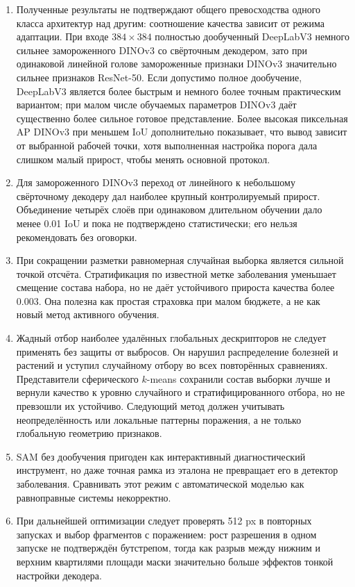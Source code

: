 \documentclass[a4paper,12pt]{extarticle}
\begin{document}
\begin{enumerate}
  \item Полученные результаты не подтверждают общего превосходства одного класса
  архитектур над другим: соотношение качества зависит от режима адаптации. При
  входе $384\times384$ полностью дообученный DeepLabV3 немного
  сильнее замороженного DINOv3 со свёрточным декодером, зато при одинаковой
  линейной голове замороженные признаки DINOv3 значительно сильнее признаков
  ResNet-50. Если допустимо полное дообучение, DeepLabV3 является более быстрым
  и немного более точным практическим вариантом; при малом числе обучаемых
  параметров DINOv3 даёт существенно более сильное готовое представление.
  Более высокая пиксельная AP DINOv3 при меньшем IoU дополнительно показывает,
  что вывод зависит от выбранной рабочей точки, хотя выполненная настройка
  порога дала слишком малый прирост, чтобы менять основной протокол.
  \item Для замороженного DINOv3 переход от линейного к небольшому свёрточному
  декодеру дал наиболее крупный контролируемый прирост. Объединение четырёх
  слоёв при одинаковом длительном обучении дало менее 0.01 IoU и пока не
  подтверждено статистически; его нельзя рекомендовать без оговорки.
  \item При сокращении разметки равномерная случайная выборка является сильной
  точкой отсчёта. Стратификация по известной метке заболевания уменьшает
  смещение состава набора, но не даёт устойчивого прироста качества более
  0.003. Она полезна как простая страховка при малом бюджете, а не как новый
  метод активного обучения.
  \item Жадный отбор наиболее удалённых глобальных дескрипторов не следует
  применять без защиты от выбросов. Он нарушил распределение болезней и
  растений и уступил случайному отбору во всех повторённых сравнениях.
  Представители сферического $k$-means сохранили состав выборки лучше и
  вернули качество к уровню случайного и стратифицированного отбора, но не
  превзошли их устойчиво. Следующий метод должен учитывать неопределённость или
  локальные паттерны поражения, а не только глобальную геометрию признаков.
  \item SAM без дообучения пригоден как интерактивный диагностический
  инструмент, но даже точная рамка из эталона не превращает его в детектор
  заболевания. Сравнивать этот режим с автоматической моделью как равноправные
  системы некорректно.
  \item При дальнейшей оптимизации следует проверять 512 px в повторных
  запусках и выбор фрагментов с поражением: рост разрешения в одном запуске не
  подтверждён бутстрепом, тогда как разрыв между нижним и верхним квартилями
  площади маски значительно больше эффектов тонкой настройки декодера.
\end{enumerate}
\end{document}
